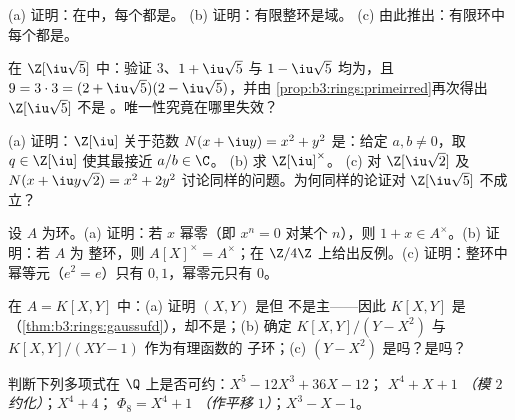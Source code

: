 \begin{exercise}[$\star$]\label{exo:b3:rings:2}
(a) 证明：在中，每个都是。
(b) 证明：有限整环是域。
(c) 由此推出：有限环中每个都是。
\end{exercise}

\begin{exercise}[$\star$]\label{exo:b3:rings:3}
在 $\Z[\iu\sqrt5]$ 中：验证 $3$、$1 + \iu\sqrt5$ 与 $1 -
\iu\sqrt5$ 均为，且 $9 = 3\cdot 3 = (2 +
\iu\sqrt5)(2 - \iu\sqrt5)$，并由
\cref{prop:b3:rings:primeirred}再次得出 $\Z[\iu\sqrt5]$ 不是
。唯一性究竟在哪里失效？
\end{exercise}

\begin{exercise}[$\star\star$]\label{exo:b3:rings:4}
(a) 证明：$\Z[\iu]$ 关于范数 $N(x + \iu y) =
x^2 + y^2$ 是：给定 $a, b \neq 0$，取 $q \in \Z[\iu]$ 使其最接近
$a/b \in \C$。
(b) 求 $\Z[\iu]^\times$。
(c) 对 $\Z[\iu\sqrt2]$ 及 $N(x + \iu y\sqrt2) =
x^2 + 2y^2$ 讨论同样的问题。为何同样的论证对
$\Z[\iu\sqrt5]$ 不成立？
\end{exercise}

\begin{exercise}[$\star\star$]\label{exo:b3:rings:5}
设 $A$ 为环。(a) 证明：若 $x$ 幂零（即 $x^n = 0$
对某个 $n$），则 $1 + x \in A^\times$。(b) 证明：若 $A$ 为
整环，则 $A[X]^\times = A^\times$；在
$\Z/4\Z$ 上给出反例。(c) 证明：整环中幂等元（$e^2 = e$）只有
$0, 1$，幂零元只有 $0$。
\end{exercise}

\begin{exercise}[$\star\star$]\label{exo:b3:rings:6}
在 $A = K[X, Y]$ 中：(a) 证明 $(X, Y)$ 是但
不是主——因此 $K[X,Y]$ 是
（\cref{thm:b3:rings:gaussufd}），却不是；(b) 确定
$K[X, Y]/(Y - X^2)$ 与 $K[X,Y]/(XY - 1)$ 作为有理函数的
子环；(c) $(Y - X^2)$ 是吗？是吗？
\end{exercise}

\begin{exercise}[$\star\star$]\label{exo:b3:rings:7}
判断下列多项式在 $\Q$ 上是否可约：$X^5 - 12X^3 + 36X - 12$；\quad
$X^4 + X + 1$ \emph{（模 $2$ 约化）}；\quad $X^4 + 4$；\quad
$\Phi_8 = X^4 + 1$ \emph{（作平移 $1$）}；\quad $X^3 - X - 1$。
\end{exercise}

